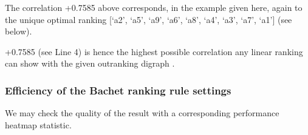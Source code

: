 \documentclass[a4paper,12pt,english]{sphinxhowto}
\begin{document}
\sphinxAtStartPar
The correlation +0.7585 above corresponds, in the example given here, again to the unique optimal  ranking {[}‘a2’, ‘a5’, ‘a9’, ‘a6’, ‘a8’, ‘a4’, ‘a3’, ‘a7’, ‘a1’{]} (see below).
\def\sphinxLiteralBlockLabel{\label{\detokenize{pearls:optimalkemeny1}}}
%
\begin{sphinxVerbatim}[commandchars=\\\{\},numbers=left,firstnumber=1,stepnumber=1]
   
\end{sphinxVerbatim}
\sphinxresetverbatimhllines

\sphinxAtStartPar
+0.7585 (see Line 4) is hence the highest possible correlation any linear ranking can show with the given outranking digraph .


\subsubsection{Efficiency of the Bachet ranking rule settings}
\label{\detokenize{pearls:efficiency-of-the-bachet-ranking-rule-settings}}
\sphinxAtStartPar
We may check the quality of the  result with a corresponding performance heatmap statistic.

\begin{sphinxVerbatim}[commandchars=\\\{\},numbers=left,firstnumber=1,stepnumber=1]
           
\end{sphinxVerbatim}
\end{document}
